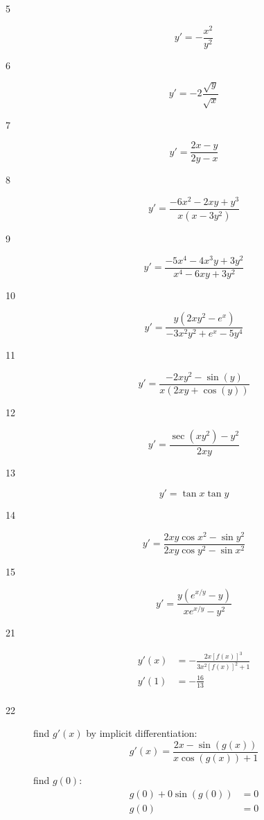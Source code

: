 \documentclass[letterpaper, landscape]{exam}
\begin{document}
  \begin{description}

    \item[5] 
      \[
        y' = - \frac{x^2}{y^2} 
      \]


    \item[6] 
      \[
        y' = -2 \frac{\sqrt{y}}{\sqrt{x}} 
      \]

    \item[7] 
      \[
        y' = \frac{2x - y}{2y - x}
      \]

    \item[8] 
      \[
        y' = \frac{ - 6x^2 - 2xy + y^3}{x \left(x - 3y^2 \right)} 
      \]

    \item[9] 
      \[
        y' = \frac{-5 x^4-4 x^3 y+3 y^2}{x^4-6 x y+3 y^2}
      \]

    \item[10] 
      \[
        y' = \frac{y \left(2x y^2 - e^x\right)}{ - 3x^2 y^2 + e^x - 5 y^4}
      \]

    \item[11] 
      \[
        y' = \frac{ - 2x y^2 - \sin (y)}{x (2x y + \cos (y))}
      \]

    \item[12] 
      \[
        y' = \frac{\sec \left( x y^2 \right) - y^2 }{2x y}
      \]

    \item[13] 
      \[
        y' = \tan x \tan y
      \]

    \item[14] 
      \[
        y' = \frac{2x y \cos x^2 - \sin y^2}{2x y \cos y^2 - \sin x^2}
      \]

    \item[15] 
      \[
        y' = \frac{y \left( e^{x/y} - y \right)}{x e^{x/y} - y^2}
      \]

    \item[21] 
      \begin{align*}
        y'(x) & = - \frac{2x [f(x)]^3}{3x^2 [f(x)]^2 + 1} \\
        y'(1) & = \boxed{ - \frac{16}{13} } \\
      \end{align*}

    \item[22] 
      find $g'(x)$ by implicit differentiation:
      \[
        g'(x) = \frac{2x - \sin (g(x)) }{x \cos (g(x)) + 1}
      \]

      find $g(0)$:
      \begin{align*}
        g(0) + 0 \sin(g(0)) & = 0 \\
        g(0)                & = 0 \\
      \end{align*}


\end{description}
\end{document}
